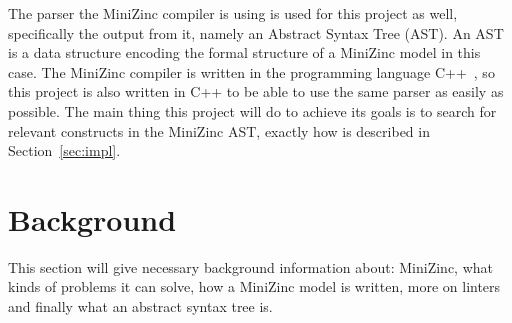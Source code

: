 \documentclass[a4paper,12pt]{article}
\begin{document}
The parser the MiniZinc compiler is using is used for this project as well, specifically
the output from it, namely an Abstract Syntax Tree (AST). An AST is a data structure
encoding the formal structure of a MiniZinc model in this case. The MiniZinc compiler is
written in the programming language C++~\cite{cpp}, so this project is also written in
C++ to be able to use the same parser as easily as possible. The main thing this project
will do to achieve its goals is to search for relevant constructs in the MiniZinc AST,
exactly how is described in Section~\ref{sec:impl}.


\section{Background}\label{sec:bakgrund}
This section will give necessary background information about: MiniZinc, what kinds of
problems it can solve, how a MiniZinc model is written, more on linters and finally what
an abstract syntax tree is.


\end{document}
